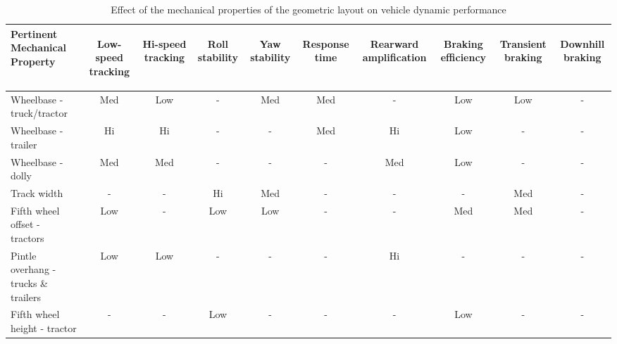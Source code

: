\begin{table}[H]
	\centering\footnotesize
	\begin{threeparttable}
	
        \begin{tabulary}{\textwidth}{lccccccccc}
            \toprule
            \textbf{Pertinent Mechanical Property} & \begin{sideways}\textbf{Low-speed tracking}\end{sideways} & \begin{sideways}\textbf{Hi-speed tracking}\end{sideways} & \begin{sideways}\textbf{Roll stability}\end{sideways} & \begin{sideways}\textbf{Yaw stability}\end{sideways} & \begin{sideways}\textbf{Response time}\end{sideways} & \begin{sideways}\textbf{Rearward amplification}\end{sideways} & \begin{sideways}\textbf{Braking efficiency}\end{sideways} & \begin{sideways}\textbf{Transient braking}\end{sideways} & \begin{sideways}\textbf{Downhill braking}\end{sideways} \\
            \midrule
            Wheelbase - truck/tractor & Med   & Low   & -     & Med   & Med   & -     & Low   & Low   & - \\
            Wheelbase - trailer & Hi    & Hi    & -     & -     & Med   & Hi    & Low   & -     & - \\
            Wheelbase - dolly & Med   & Med   & -     & -     & -     & Med   & Low   & -     & - \\
            Track width & -     & -     & Hi    & Med   & -     & -     & -     & Med   & - \\
            Fifth wheel offset - tractors & Low   & -     & Low   & Low   & -     & -     & Med   & Med   & - \\
            Pintle overhang - trucks \& trailers & Low   & Low   & -     & -     & -     & Hi    & -     & -     & - \\
            Fifth wheel height - tractor & -     & -     & Low   & -     & -     & -     & Low   & -     & -\\
            \bottomrule
		\end{tabulary}

		\caption{Effect of the mechanical properties of the geometric layout on vehicle dynamic performance \cite{Fancher1986}}
		\label{table:effect-of-the-mechanical-properties-of-geometric-layout-on-vehicle-dynamic-performance}

	\end{threeparttable}
\end{table}
